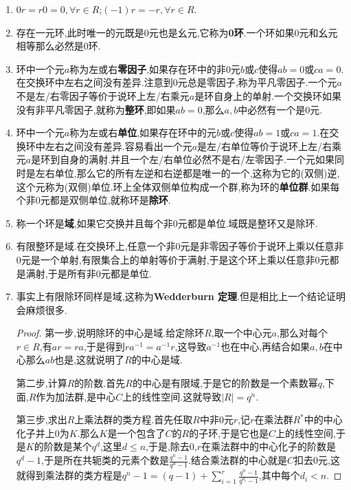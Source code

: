 \begin{enumerate}
	\item $0r=r0=0,\forall r\in R$;$(-1)r=-r,\forall r\in R$.
	\item 存在一元环,此时唯一的元既是0元也是幺元,它称为\textbf{0环}.一个环如果0元和幺元相等那么必然是0环.
	\item 环中一个元$a$称为左或右\textbf{零因子},如果存在环中的非0元$b$或$c$使得$ab=0$或$ca=0$.在交换环中左右之间没有差异.注意到0元总是零因子,称为平凡零因子.一个元$a$不是左/右零因子等价于说环上左/右乘元$a$是环自身上的单射.一个交换环如果没有非平凡零因子,就称为\textbf{整环},即如果$ab=0$,那么$a,b$中必然有一个是0元.
	\item 环中一个元$a$称为左或右\textbf{单位},如果存在环中的元$b$或$c$使得$ab=1$或$ca=1$.在交换环中左右之间没有差异.容易看出一个元$a$是左/右单位等价于说环上左/右乘元$a$是环到自身的满射.并且一个左/右单位必然不是右/左零因子.一个元如果同时是左右单位,那么它的所有左逆和右逆都是唯一的一个,这称为它的(双侧)逆,这个元称为(双侧)单位.环上全体双侧单位构成一个群,称为环的\textbf{单位群}.如果每个非0元都是双侧单位,就称环是\textbf{除环}.
	\item 称一个环是\textbf{域},如果它交换并且每个非0元都是单位.域既是整环又是除环.
	\item 有限整环是域.在交换环上,任意一个非0元是非零因子等价于说环上乘以任意非0元是一个单射,有限集合上的单射等价于满射,于是这个环上乘以任意非0元都是满射,于是所有非0元都是单位.
	\item 事实上有限除环同样是域,这称为\textbf{Wedderburn 定理}.但是相比上一个结论证明会麻烦很多.
	\begin{proof}
		
		第一步,说明除环的中心是域.给定除环$R$,取一个中心元$a$,那么对每个$r\in R$,有$ar=ra$,于是得到$ra^{-1}=a^{-1}r$,这导致$a^{-1}$也在中心,再结合如果$a,b$在中心那么$ab$也是,这就说明了$R$的中心是域.
		
		第二步,计算$R$的阶数.首先$R$的中心是有限域,于是它的阶数是一个素数幂$q$,下面,$R$作为加法群,是中心$C$上的线性空间.这就导致$|R|=q^n$.
		
		第三步,求出$R$上乘法群的类方程.首先任取$R$中非0元$r$,记$r$在乘法群$R^*$中的中心化子并上0为$K$.那么$K$是一个包含了$C$的$R$的子环,于是它也是$C$上的线性空间,于是$K$的阶数是某个$q^d$,这里$d\le n$,于是,除去0,$r$在乘法群中的中心化子的阶数是$q^d-1$,于是所在共轭类的元素个数是$\frac{q^n-1}{q^d-1}$.结合乘法群的中心就是$C$扣去0元,这就得到乘法群的类方程是$q^n-1=(q-1)+\sum_{i=1}^{r}\frac{q^n-1}{q^{d_i}-1}$,其中每个$d_i<n$.
		

\end{proof}
\end{enumerate}
